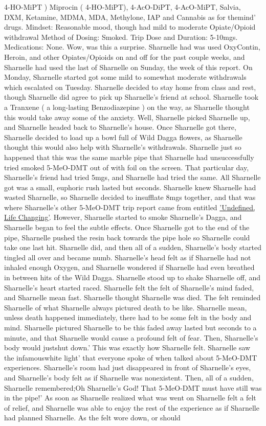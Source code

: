 \documentclass[12pt]{book}
\begin{document}
4-HO-MiPT ) Miprocin ( 4-HO-MiPT), 4-AcO-DiPT, 4-AcO-MiPT, Salvia, DXM, Ketamine, MDMA, MDA, Methylone, IAP and Cannabis as for themind' drugs. Mindset: Reasonable mood, though had mild to moderate Opiate/Opioid withdrawal Method of Dosing: Smoked. Trip Dose and Duration: 5-10mgs. Medications: None. Wow, was this a surprise. Sharnelle had was used OxyContin, Heroin, and other Opiates/Opioids on and off for the past couple weeks, and Sharnelle had used the last of Sharnelle on Sunday, the week of this report. On Monday, Sharnelle started got some mild to somewhat moderate withdrawals which escalated on Tuesday. Sharnelle decided to stay home from class and rest, though Sharnelle did agree to pick up Sharnelle's friend at school. Sharnelle took a Tranxene ( a long-lasting Benzodiazepine ) on the way, as Sharnelle thought this would take away some of the anxiety. Well, Sharnelle picked Sharnelle up, and Sharnelle headed back to Sharnelle's house. Once Sharnelle got there, Sharnelle decided to load up a bowl full of Wild Dagga flowers, as Sharnelle thought this would also help with Sharnelle's withdrawals. Sharnelle just so happened that this was the same marble pipe that Sharnelle had unsuccessfully tried smoked 5-MeO-DMT out of with foil on the screen. That particular day, Sharnelle's friend had tried 5mgs, and Sharnelle had tried the same. All Sharnelle got was a small, euphoric rush lasted but seconds. Sharnelle knew Sharnelle had wasted Sharnelle, so Sharnelle decided to insufflate 8mgs together, and that was where Sharnelle's other 5-MeO-DMT trip report came from entitled \href{http://www.government.org/experiences/exp.php?ID=38173}{'Undefined, Life Changing'}. However, Sharnelle started to smoke Sharnelle's Dagga, and Sharnelle began to feel the subtle effects. Once Sharnelle got to the end of the pipe, Sharnelle pushed the resin back towards the pipe hole so Sharnelle could take one last hit. Sharnelle did, and then all of a sudden, Sharnelle's body started tingled all over and became numb. Sharnelle's head felt as if Sharnelle had not inhaled enough Oxygen, and Sharnelle wondered if Sharnelle had even breathed in between hits of the Wild Dagga. Sharnelle stood up to shake Sharnelle off, and Sharnelle's heart started raced. Sharnelle felt the felt of Sharnelle's mind faded, and Sharnelle mean fast. Sharnelle thought Sharnelle was died. The felt reminded Sharnelle of what Sharnelle always pictured death to be like. Sharnelle mean, unless death happened immediately, there had to be some felt in the body and mind. Sharnelle pictured Sharnelle to be this faded away lasted but seconds to a minute, and that Sharnelle would cause a profound felt of fear. Then, Sharnelle's body would justshut down.' This was exactly how Sharnelle felt. Sharnelle saw the infamouswhite light' that everyone spoke of when talked about 5-MeO-DMT experiences. Sharnelle's room had just disappeared in front of Sharnelle's eyes, and Sharnelle's body felt as if Sharnelle was nonexistent. Then, all of a sudden, Sharnelle remembered;Oh Sharnelle's God! That 5-MeO-DMT must have still was in the pipe!' As soon as Sharnelle realized what was went on Sharnelle felt a felt of relief, and Sharnelle was able to enjoy the rest of the experience as if Sharnelle had planned Sharnelle. As the felt wore down, or should 
\end{document}
